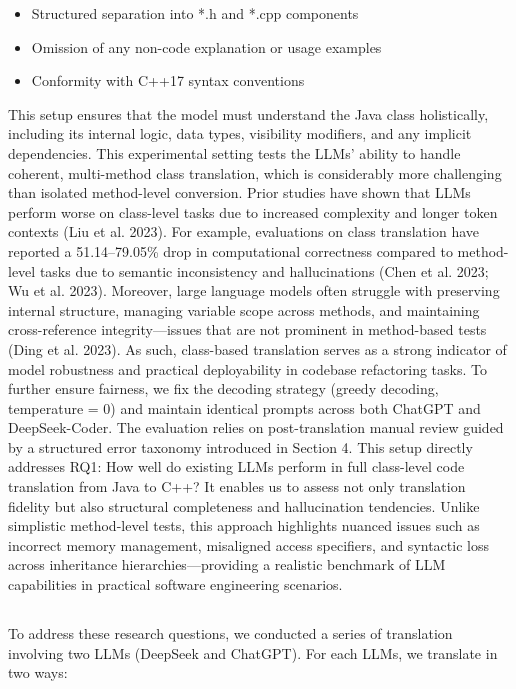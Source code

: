 \begin{itemize}
    \item Structured separation into *.h and *.cpp components
	\item Omission of any non-code explanation or usage examples
	\item Conformity with C++17 syntax conventions
\end{itemize}
This setup ensures that the model must understand the Java class holistically, including its internal logic, data types, visibility modifiers, and any implicit dependencies.
This experimental setting tests the LLMs’ ability to handle coherent, multi-method class translation, which is considerably more challenging than isolated method-level conversion. Prior studies have shown that LLMs perform worse on class-level tasks due to increased complexity and longer token contexts (Liu et al. 2023). For example, evaluations on class translation have reported a 51.14–79.05\% drop in computational correctness compared to method-level tasks due to semantic inconsistency and hallucinations (Chen et al. 2023; Wu et al. 2023). Moreover, large language models often struggle with preserving internal structure, managing variable scope across methods, and maintaining cross-reference integrity—issues that are not prominent in method-based tests (Ding et al. 2023). As such, class-based translation serves as a strong indicator of model robustness and practical deployability in codebase refactoring tasks.
To further ensure fairness, we fix the decoding strategy (greedy decoding, temperature = 0) and maintain identical prompts across both ChatGPT and DeepSeek-Coder. The evaluation relies on post-translation manual review guided by a structured error taxonomy introduced in Section 4.
This setup directly addresses RQ1: How well do existing LLMs perform in full class-level code translation from Java to C++? It enables us to assess not only translation fidelity but also structural completeness and hallucination tendencies. Unlike simplistic method-level tests, this approach highlights nuanced issues such as incorrect memory management, misaligned access specifiers, and syntactic loss across inheritance hierarchies—providing a realistic benchmark of LLM capabilities in practical software engineering scenarios.
\subsection{}

To address these research questions, we conducted a series of translation involving two LLMs (DeepSeek and ChatGPT). For each LLMs, we translate in two ways:

